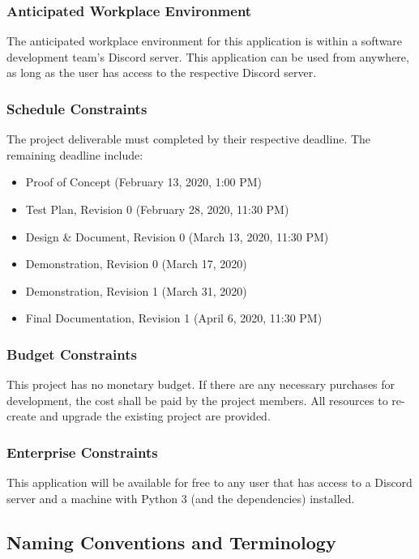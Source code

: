\documentclass[12pt, titlepage]{article}
\begin{document}
\subsubsection{Anticipated Workplace Environment}
The anticipated workplace environment for this application is within a software development team's Discord server. This application can be used from anywhere, as long as the user has access to the respective Discord server.

\subsubsection{Schedule Constraints}
The project deliverable must completed by their respective deadline. The remaining deadline include:
\begin{itemize}
    \item Proof of Concept (February 13, 2020, 1:00 PM)
    \item Test Plan, Revision 0 (February 28, 2020, 11:30 PM)
    \item Design \& Document, Revision 0 (March 13, 2020, 11:30 PM)
    \item Demonstration, Revision 0 (March 17, 2020)
    \item Demonstration, Revision 1 (March 31, 2020)
    \item Final Documentation, Revision 1 (April 6, 2020, 11:30 PM)
\end{itemize}

\subsubsection{Budget Constraints}
This project has no monetary budget. If there are any necessary purchases for development, the cost shall be paid by the project members. All resources to re-create and upgrade the existing project are provided.

\subsubsection{Enterprise Constraints}
This application will be available for free to any user that has access to a Discord server and a machine with Python 3 (and the dependencies) installed.

\subsection{Naming Conventions and Terminology}
\end{document}
